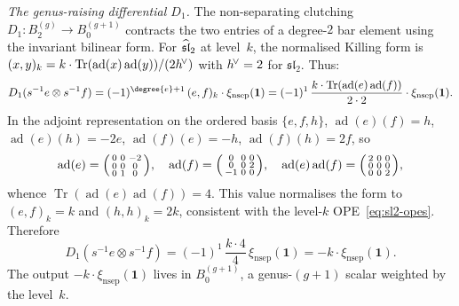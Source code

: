 \begin{example}
\medskip\noindent
\emph{The genus-raising differential $D_1$.}
The non-separating clutching
$D_1 \colon B_2^{(g)} \to B_0^{(g+1)}$ contracts the two
entries of a degree-$2$ bar element using the invariant
bilinear form. For $\widehat{\mathfrak{sl}}_2$ at level~$k$, the
normalised Killing form is
$(x, y)_k = k \cdot \operatorname{Tr}(\operatorname{ad}(x)
\operatorname{ad}(y)) / (2h^{\!\vee})$
with $h^{\!\vee} = 2$ for $\mathfrak{sl}_2$. Thus:
\begin{equation}\label{eq:sl2-D1}
 D_1(s^{-1}e \otimes s^{-1}f)
 = (-1)^{\degree{e}+1}\,
 (e, f)_k \cdot \xi_{\mathrm{nsep}}(\mathbf{1})
 = (-1)^{1}\, \frac{k \cdot \operatorname{Tr}(\operatorname{ad}(e)
 \operatorname{ad}(f))}{2 \cdot 2} \cdot
 \xi_{\mathrm{nsep}}(\mathbf{1}).
\end{equation}
In the adjoint representation on the ordered basis $\{e, f, h\}$,
$\operatorname{ad}(e)(f) = h$, $\operatorname{ad}(e)(h) = -2e$,
$\operatorname{ad}(f)(e) = -h$, $\operatorname{ad}(f)(h) = 2f$, so
\[
\operatorname{ad}(e)
= \begin{psmallmatrix} 0 & 0 & -2 \\ 0 & 0 & 0 \\ 0 & 1 & 0
\end{psmallmatrix},
\quad
\operatorname{ad}(f)
= \begin{psmallmatrix} 0 & 0 & 0 \\ 0 & 0 & 2 \\ -1 & 0 & 0
\end{psmallmatrix},
\quad
\operatorname{ad}(e)\operatorname{ad}(f)
= \begin{psmallmatrix} 2 & 0 & 0 \\ 0 & 0 & 0 \\ 0 & 0 & 2
\end{psmallmatrix},
\]
whence $\operatorname{Tr}(\operatorname{ad}(e)\operatorname{ad}(f)) = 4$.
This value normalises the form to $(e,f)_k = k$ and $(h,h)_k = 2k$,
consistent with the level-$k$ OPE~\eqref{eq:sl2-opes}. Therefore
\[
 D_1(s^{-1}e \otimes s^{-1}f)
 = (-1)^{1}\,\frac{k \cdot 4}{4}\,
 \xi_{\mathrm{nsep}}(\mathbf{1})
 = -k \cdot \xi_{\mathrm{nsep}}(\mathbf{1}).
\]
The output $-k \cdot \xi_{\mathrm{nsep}}(\mathbf{1})$
lives in $B_0^{(g+1)}$, a genus-$(g+1)$ scalar weighted
by the level~$k$.
\end{example}

